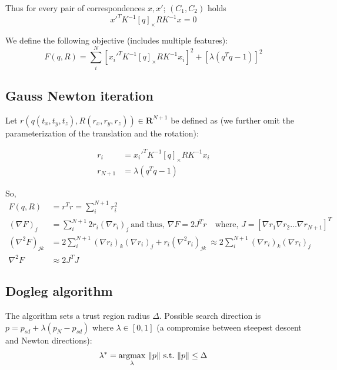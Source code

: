\documentclass[10pt]{article}         %
\DeclarePairedDelimiter\norm{\lVert}{\rVert}%
\begin{document}
Thus for every pair of correspondences $x,x'$; $(C_1,C_2)$ holds
\[
x'^TK^{-1}[q]_{\times}RK^{-1}x=0
\]

We define the following objective (includes multiple features):
\[
F(q,R) = \sum_i^N{ [x_i'^TK^{-1}[q]_{\times}RK^{-1}x_i]^2 } + [\lambda(q^Tq-1)]^2
\]


\subsection{Gauss Newton iteration}

Let $r(q(t_x,t_y,t_z),R(r_x,r_y,r_z)) \in \mathbf{R}^{N+1}$ be defined as (we further omit the parameterization of the translation and the rotation):

\begin{align*}
  r_i &= x_i'^TK^{-1}[q]_{\times}RK^{-1}x_i\\
  r_{N+1} &= \lambda(q^Tq-1)
\end{align*}

So,
\begin{align*}
F(q,R) &= r^Tr = \sum_i^{N+1} r_i^2\\
(\nabla F)_j& = \sum_i^{N+1} 2 r_i (\nabla r_i)_j\ \text{and thus, } \nabla F = 2J^Tr\quad\text{where, } J=[\nabla r_1 \nabla r_2 \ldots \nabla r_{N+1}]^T\\
(\nabla^2 F)_{jk} &= 2\sum_i^{N+1} (\nabla r_i)_k (\nabla r_i)_j+r_i(\nabla^2 r_i)_{jk}\ \approx 2\sum_i^{N+1} (\nabla r_i)_k (\nabla r_i)_j\\
\nabla^2 F &\approx 2J^TJ
\end{align*}

\subsection{Dogleg algorithm}
The algorithm sets a trust region radius $\Delta$.  Possible search
direction is $p = p_{sd}+\lambda(p_N-p_{sd})$ where $\lambda \in [0,1]$ (a compromise
between steepest descent and Newton directions):
\[
\lambda^*=\underset{\lambda}{\text{argmax}}\ \norm{p}\ \text{s.t.}\ \norm{p}\leq\Delta
\]
\end{document}
